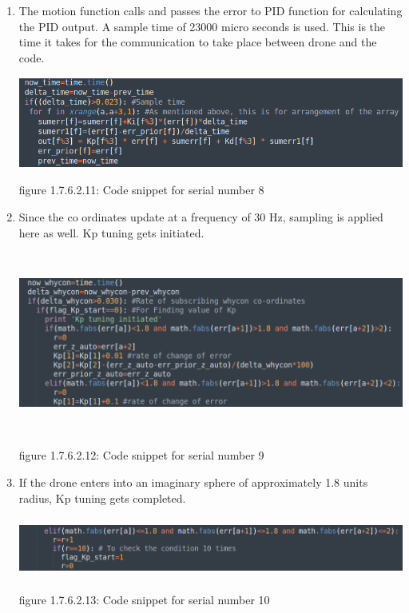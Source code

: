 \documentclass[a4paper,12pt,oneside]{book}
\begin{document}
\begin{enumerate}
\item The motion function calls and passes the error to PID function for calculating the PID output. A sample time of 23000 micro seconds is used. This is the time it takes for the communication to take place between drone and the code.


\includegraphics[width = 13cm , height= 3cm]{PID_err_8(1).png}
\begin{center}
    figure 1.7.6.2.11: Code snippet for serial number 8
\end{center}

\item Since the co ordinates update at a frequency of 30 Hz, sampling is applied here as well. Kp tuning gets initiated.


\includegraphics[width = 13cm , height= 6cm]{PID_err_8(2).png}
\begin{center}
    figure 1.7.6.2.12: Code snippet for serial number 9
\end{center}

\item If the drone enters into an imaginary sphere of approximately 1.8 units radius, Kp tuning gets completed.


\includegraphics[width = 13cm , height= 2cm]{PID_err_8(3).png}
\begin{center}
    figure 1.7.6.2.13: Code snippet for serial number 10
\end{center}



\end{enumerate}
\end{document}
